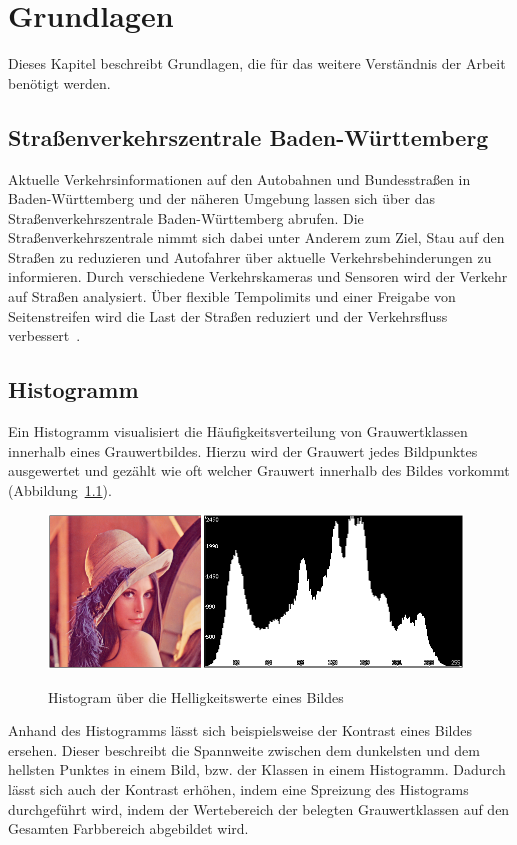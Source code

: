 \chapter{Grundlagen}

Dieses Kapitel beschreibt Grundlagen, die für das weitere Verständnis der Arbeit benötigt werden.

\section{Straßenverkehrszentrale Baden-Württemberg} %
Aktuelle Verkehrsinformationen auf den Autobahnen und Bundesstraßen in Baden-Württemberg und der näheren Umgebung lassen sich über das Straßenverkehrszentrale Baden-Württemberg abrufen. Die Straßenverkehrszentrale nimmt sich dabei unter Anderem zum Ziel, Stau auf den Straßen zu reduzieren und Autofahrer über aktuelle Verkehrsbehinderungen zu informieren.
Durch verschiedene Verkehrskameras und Sensoren wird der Verkehr auf Straßen analysiert. Über flexible Tempolimits und einer Freigabe von Seitenstreifen wird die Last der Straßen reduziert und der Verkehrsfluss verbessert~\cite{svzbw}.

\section{Histogramm} %
Ein Histogramm visualisiert die Häufigkeitsverteilung von Grauwertklassen innerhalb eines Grauwertbildes.
Hierzu wird der Grauwert jedes Bildpunktes ausgewertet und gezählt wie oft welcher Grauwert innerhalb des Bildes vorkommt (Abbildung~\ref{fig:Histogramm}).

\begin{figure}[ht]
   \centering
     \includegraphics[width=11cm]{Bilder/histogram} \\
 \caption{Histogram über die Helligkeitswerte eines Bildes}
 \label{fig:Histogramm}
\end{figure}

Anhand des Histogramms lässt sich beispielsweise der Kontrast eines Bildes ersehen. 
Dieser beschreibt die Spannweite zwischen dem dunkelsten und dem hellsten Punktes in einem Bild, bzw. der Klassen in einem Histogramm.
Dadurch lässt sich auch der Kontrast erhöhen, indem eine Spreizung des Histograms durchgeführt wird, indem
der Wertebereich der belegten Grauwertklassen auf den Gesamten Farbbereich abgebildet wird.

